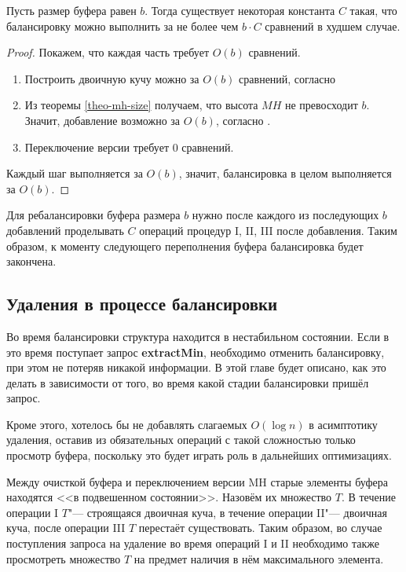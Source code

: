 \begin{theorem}\label{theo-balancing-constant}
Пусть размер буфера равен $b$. Тогда существует некоторая константа $C$ такая,
что балансировку можно выполнить за не более чем $b\cdot C$ сравнений в худшем случае.
\end{theorem}
\begin{proof}
Покажем, что каждая часть требует $O(b)$ сравнений.
\begin{enumerate}[label=\Roman*.]
\item Построить двоичную кучу можно за $O(b)$ сравнений, согласно 
\item Из теоремы \ref{theo-mh-size} получаем, что высота $MH$ не превосходит $b$. Значит,
добавление возможно за $O(b)$, согласно .
\item Переключение версии требует 0 сравнений.
\end{enumerate}
Каждый шаг выполняется за $O(b)$, значит, балансировка в целом выполняется за $O(b)$.
\end{proof}

Для ребалансировки буфера размера $b$ нужно после каждого из последующих $b$
добавлений проделывать $C$ операций процедур I, II, III после добавления.
Таким образом, к моменту следующего переполнения буфера балансировка будет закончена.

\subsection{Удаления в процессе балансировки}

Во время балансировки структура находится в нестабильном состоянии. Если
в это время поступает запрос \textbf{extractMin}, необходимо отменить балансировку,
при этом не потеряв никакой информации. В этой главе будет описано, как это делать
в зависимости от того, во время какой стадии балансировки пришёл запрос.

Кроме этого, хотелось бы не добавлять слагаемых $O(\log n)$ в асимптотику удаления,
оставив из обязательных операций с такой сложностью только просмотр буфера,
поскольку это будет играть роль в дальнейших оптимизациях.

Между очисткой буфера и переключением версии MH старые элементы буфера находятся
<<в подвешенном состоянии>>. Назовём их множество $T$. В течение операции I $T$"---
строящаяся двоичная куча, в течение операции II"--- двоичная куча, после операции III
$T$ перестаёт существовать. Таким образом, во случае поступления запроса на удаление
во время операций I и II необходимо также просмотреть множество $T$ на предмет
наличия в нём максимального элемента.

